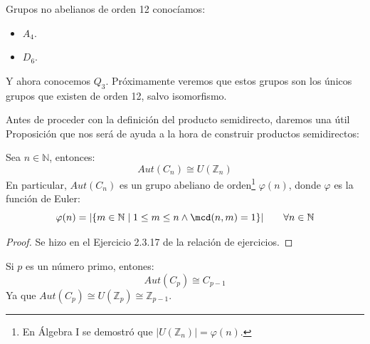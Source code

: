 \begin{ejemplo}
    Grupos no abelianos de orden 12 conocíamos:
    \begin{itemize}
        \item $A_4$.
        \item $D_6$.
    \end{itemize}
    Y ahora conocemos $Q_3$. Próximamente veremos que estos grupos son los únicos grupos que existen de orden 12, salvo isomorfismo.
\end{ejemplo}

\noindent
Antes de proceder con la definición del producto semidirecto, daremos una útil Proposición que nos será de ayuda a la hora de construir productos semidirectos:
\begin{prop}\label{prop:aut_ciclico}
    Sea $n\in \mathbb{N}$, entonces:
    \begin{equation*}
        Aut(C_n) \cong U(\mathbb{Z}_n)
    \end{equation*}
    En particular, $Aut(C_n)$ es un grupo abeliano de orden\footnote{En Álgebra I se demostró que $|U(\mathbb{Z}_n)| = \varphi(n)$.} $\varphi(n)$, donde $\varphi$ es la función de Euler:
    \begin{equation*}
        \varphi(n) = |\{m\in \mathbb{N} \mid 1\leq m\leq n \land \mcd(n,m)=1\}| \qquad \forall n\in \mathbb{N}
    \end{equation*}
    \begin{proof}
        Se hizo en el Ejercicio 2.3.17 de la relación de ejercicios.
    \end{proof}
\end{prop}

\begin{observacion}
    Si $p$ es un número primo, entones:
    \begin{equation*}
        Aut(C_p) \cong C_{p-1}
    \end{equation*}
    Ya que $Aut(C_p) \cong U(\mathbb{Z}_p) \cong \mathbb{Z}_{p-1}$.
\end{observacion}

